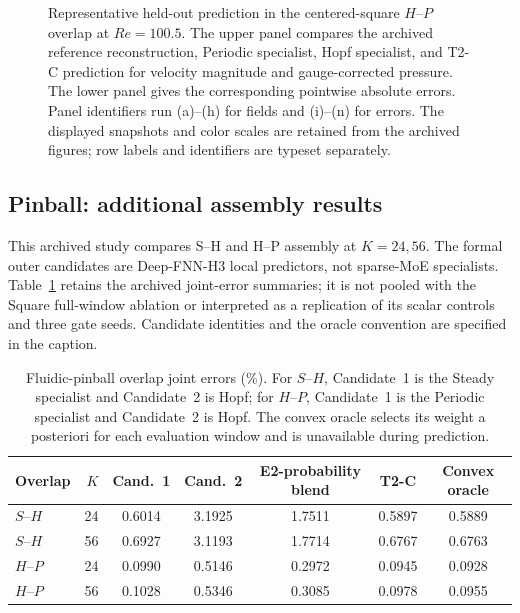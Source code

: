 \begin{figure}[p]
\centering
{}

\vspace{0.35em}
\caption{Representative held-out prediction in the centered-square
$H$--$P$ overlap at $Re=100.5$. The upper panel compares the archived reference reconstruction, Periodic specialist, Hopf specialist, and T2-C prediction for velocity magnitude and gauge-corrected pressure. The lower panel gives the
corresponding pointwise absolute errors. Panel identifiers run (a)--(h) for fields and (i)--(n) for errors. The displayed snapshots and color scales are retained from the archived figures; row labels and identifiers are typeset separately.}
\label{fig:app_square_hp_full}
\end{figure}

\FloatBarrier

\subsection{Pinball: additional assembly results}
\label{app:pinball_overlap_results}
This archived study compares S--H and H--P assembly at $K=24,56$.
The formal outer candidates are Deep-FNN-H3 local predictors, not
sparse-MoE specialists. Table~\ref{tab:pinball_overlap} retains the
archived joint-error summaries; it is not pooled with the Square
full-window ablation or interpreted as a replication of its scalar
controls and three gate seeds. Candidate identities and the oracle
convention are specified in the caption.

\begin{table}[H]
\centering
\caption{
Fluidic-pinball overlap joint errors (\%). For $S$--$H$, Candidate~1 is the Steady specialist and Candidate~2 is Hopf; for $H$--$P$, Candidate~1 is the Periodic specialist and Candidate~2 is Hopf.
The convex oracle selects its weight a posteriori for each evaluation window and is unavailable during prediction.
}
\label{tab:pinball_overlap}
\small
\setlength{\tabcolsep}{3.5pt}
\begin{tabular}{lrccccc}
\toprule
Overlap & $K$ & Cand.~1 & Cand.~2 & E2-probability blend & T2-C & Convex oracle \\
\midrule
$S$--$H$ & 24 & 0.6014 & 3.1925 & 1.7511 & 0.5897 & 0.5889 \\
$S$--$H$ & 56 & 0.6927 & 3.1193 & 1.7714 & 0.6767 & 0.6763 \\
$H$--$P$ & 24 & 0.0990 & 0.5146 & 0.2972 & 0.0945 & 0.0928 \\
$H$--$P$ & 56 & 0.1028 & 0.5346 & 0.3085 & 0.0978 & 0.0955 \\
\bottomrule
\end{tabular}
\end{table}
